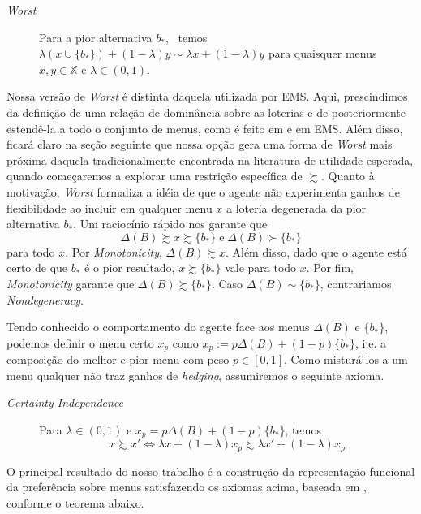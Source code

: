 \documentclass[11pt, a4paper]{article}
\theoremstyle{nonumberplain}
\theoremstyle{plain}
\theoremstyle{plain}
\theoremstyle{plain}
\begin{document}
\begin{description}
\item[\textit{Worst}] Para a pior alternativa $b_*$, ~temos $\lambda\left(x\cup \{b_*\}\right)+(1-\lambda)y\sim \lambda x + (1-\lambda)y$ para quaisquer menus $x,y\in \mathbb{X}$ e $\lambda\in (0,1)$. 
\end{description}

Nossa versão de \emph{Worst} é distinta daquela utilizada por EMS. Aqui, prescindimos da definição de uma relação de dominância sobre as loterias e de posteriormente estendê-la a todo o conjunto de menus, como é feito em \cite{Kreps1979} e em EMS. Além disso, ficará claro na seção seguinte que nossa opção gera uma forma de \emph{Worst} mais próxima daquela tradicionalmente encontrada na literatura de utilidade esperada, quando começaremos a explorar uma restrição específica de $\succsim$. Quanto à motivação, \emph{Worst} formaliza a idéia de que o agente não experimenta ganhos de flexibilidade ao incluir  em qualquer menu $x$ a loteria degenerada da pior alternativa $b_*$. Um raciocínio rápido nos garante que $$\Delta(B)\succsim x\succsim \{b_*\} \; \text{e} \; \Delta(B)\succ \{b_*\}$$ para todo $x$. Por \textit{Monotonicity}, $\Delta(B) \succsim x$. Além disso, dado que o agente está certo de que $b_*$ é o pior resultado, $x\succsim \{b_*\}$ vale para todo $x$. Por fim, \textit{Monotonicity} garante que $\Delta(B)\succsim \{b_*\}$. Caso $\Delta(B) \sim \{b_*\}$, contrariamos \textit{Nondegeneracy}. 

Tendo conhecido o comportamento do agente face aos menus $\Delta(B)$ e $\{b_*\}$, podemos definir o menu certo $x_p$ como $x_p:=p\Delta(B)+(1-p)\{b_*\}$, i.e. a composição do melhor e pior menu com peso $p\in [0,1]$. Como misturá-los a um menu qualquer não traz ganhos de \emph{hedging}, assumiremos o seguinte axioma.

\begin{description}
\item [\textit{Certainty Independence}] Para $\lambda\in (0,1)$ e $x_p=p\Delta(B)+(1-p)\{b_*\}$, temos $$x\succsim x' \Leftrightarrow \lambda x +(1-\lambda)x_p\succsim \lambda x' + (1-\lambda)x_p$$ 

\end{description}

O principal resultado do nosso trabalho é a construção da representação funcional da preferência sobre menus satisfazendo os axiomas acima, baseada em \cite{Epstein2007}, conforme o teorema abaixo.
\end{document}
